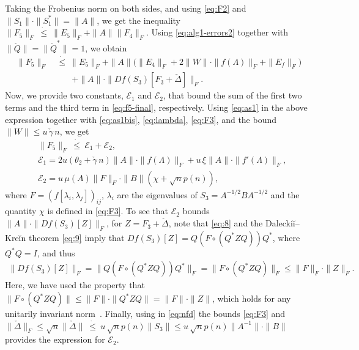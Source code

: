 \documentclass[DIV=14]{scrartcl}
\newcommand\ledot{~\dot{\le}~}
\theoremstyle{thmstyletwo}
\theoremstyle{definition}
\numberwithin{equation}{section}
\newcommand{\wc}{\check}
\renewcommand{\Delta}{\varDelta}
\renewcommand{\Lambda}{\varLambda}
\newcommand{\Df}[3]{D#1(#2)[#3]}
\begin{document}
{Taking the Frobenius norm on both sides, and using \eqref{eq:F2} and $\|S_1\|\cdot\|S_1^*\|=\|A\|$, we get the inequality $\|F_5\|_F\ledot \|E_5\|_F+\|A\|\|F_4\|_F$. Using \eqref{eq:alg1-errors2} together with $\|\wc Q\|=\|\wc Q^*\|=1$, we obtain
\begin{equation}\label{eq:f5-final}
\begin{aligned}
\|F_5\|_F&\ledot \|E_5\|_F+\|A\|\bigl(\|E_4\|_F+2\|W\| \cdot\|f(\Lambda)\|_F
+\|E_f\|_F\bigr)\\
&\qquad+\|A\|\cdot \|\Df{f}{S_3}{F_3+\wc\Delta}\|_F.
\end{aligned}
\end{equation}
Now, we provide two constants, $\mathcal E_1$ and $\mathcal E_2$, that bound the sum of the first two terms and the third term in \eqref{eq:f5-final}, respectively. Using \eqref{eq:as1} in the above expression together with \eqref{eq:as1bis}, \eqref{eq:lambda}, \eqref{eq:F3}, and the bound $\|W\|\le u\,\wc\gamma\, n$, we get
\begin{equation}\label{eq:bound1}
\begin{split}
    &\|F_5\|_F\ledot \mathcal E_1+\mathcal E_2,\\
     &\mathcal E_1=
     2u(\theta_2+\wc\gamma\, n)\|A\|\cdot\|f(\Lambda)\|_F +u\,\xi\|A\|\cdot\|f'(\Lambda)\|_F,
     \\
    &\mathcal E_2=u\,\mu(A)
    \|F\|_F \cdot \|B\| (\chi +\sqrt n p(n)),
\end{split}
\end{equation}
where  $F=(f[\lambda_i,\lambda_j])_{ij}$, $\lambda_i$ are the eigenvalues of $S_3=A^{-1/2}BA^{-1/2}$ and the quantity $\chi$ is defined in \eqref{eq:F3}.
To see that $\mathcal E_2$ bounds $\|A\|\cdot \|\Df{f}{S_3}{Z}\|_F$,  for $Z=F_3+\wc\Delta$, note that \eqref{eq:8} and the Daleckiĭ--Kreĭn theorem \eqref{eq:9} imply that $\Df{f}{S_3}{Z}=Q(F\circ (Q^*ZQ))Q^*$, where $Q^*Q=I$, and thus
\begin{equation}\label{eq:nfd}
\begin{split}
\|\Df{f}{S_3}{Z}\|_F
 = \|Q(F\circ (Q^* Z Q))Q^*\|_F =\|F\circ (Q^* Z Q)\|_F \le  \|F\|_F\cdot \| Z \|_F.
\end{split}
\end{equation}
Here, we have used the property that $\|F\circ (Q^* Z Q)\|\le\|F\|\cdot\|Q^* Z Q\|=\|F\|\cdot\| Z \|$,
which holds for any unitarily invariant norm~\cite[Fact~11.10.96]{bern18}.
Finally, using in \eqref{eq:nfd} the bounds \eqref{eq:F3} and
\mbox{$\|\wc\Delta\|_F\le \sqrt n\|\wc\Delta\|\ledot u\, \sqrt n p(n)\|S_3\|\le u\, \sqrt n p(n)\|A^{-1}\|\cdot\|B\|$} provides the expression for $\mathcal E_2$.

}
\end{document}
